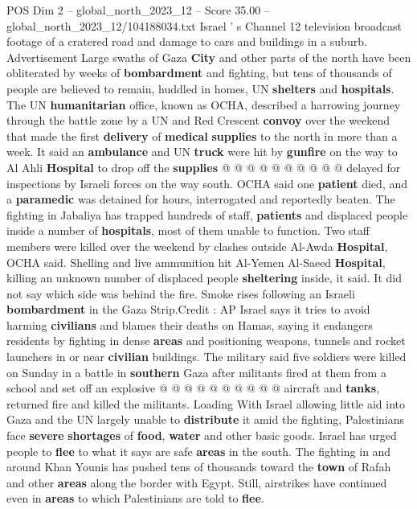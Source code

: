 \begin{textsample}{POS Dim 2 – global\_north\_2023\_12 – Score 35.00 – global\_north\_2023\_12/104188034.txt}
Israel ' s Channel 12 television broadcast footage of a cratered road and damage to cars and buildings in a suburb.
Advertisement Large swaths of Gaza \textbf{City} and other parts of the north have been obliterated by weeks of \textbf{bombardment} and fighting, but tens of thousands of people are believed to remain, huddled in homes, UN \textbf{shelters} and \textbf{hospitals}.
The UN \textbf{humanitarian} office, known as OCHA, described a harrowing journey through the battle zone by a UN and Red Crescent \textbf{convoy} over the weekend that made the first \textbf{delivery} of \textbf{medical} \textbf{supplies} to the north in more than a week.
It said an \textbf{ambulance} and UN \textbf{truck} were hit by \textbf{gunfire} on the way to Al Ahli \textbf{Hospital} to drop off the \textbf{supplies} @ @ @ @ @ @ @ @ @ @ delayed for inspections by Israeli forces on the way south.
OCHA said one \textbf{patient} died, and a \textbf{paramedic} was detained for hours, interrogated and reportedly beaten.
The fighting in Jabaliya has trapped hundreds of staff, \textbf{patients} and displaced people inside a number of \textbf{hospitals}, most of them unable to function.
Two staff members were killed over the weekend by clashes outside Al-Awda \textbf{Hospital}, OCHA said.
Shelling and live ammunition hit Al-Yemen Al-Saeed \textbf{Hospital}, killing an unknown number of displaced people \textbf{sheltering} inside, it said.
It did not say which side was behind the fire.
Smoke rises following an Israeli \textbf{bombardment} in the Gaza Strip.Credit : AP Israel says it tries to avoid harming \textbf{civilians} and blames their deaths on Hamas, saying it endangers residents by fighting in dense \textbf{areas} and positioning weapons, tunnels and rocket launchers in or near \textbf{civilian} buildings.
The military said five soldiers were killed on Sunday in a battle in \textbf{southern} Gaza after militants fired at them from a school and set off an explosive @ @ @ @ @ @ @ @ @ @ aircraft and \textbf{tanks}, returned fire and killed the militants.
Loading With Israel allowing little aid into Gaza and the UN largely unable to \textbf{distribute} it amid the fighting, Palestinians face \textbf{severe} \textbf{shortages} of \textbf{food}, \textbf{water} and other basic goods.
Israel has urged people to \textbf{flee} to what it says are safe \textbf{areas} in the south.
The fighting in and around Khan Younis has pushed tens of thousands toward the \textbf{town} of Rafah and other \textbf{areas} along the border with Egypt.
Still, airstrikes have continued even in \textbf{areas} to which Palestinians are told to \textbf{flee}.

\end{textsample}
